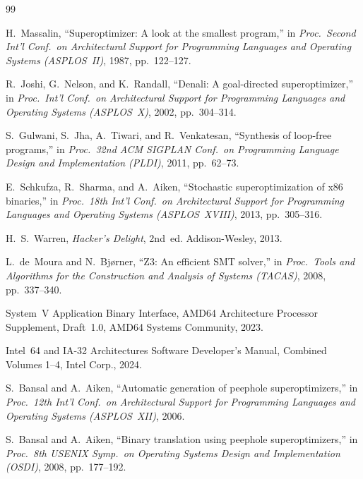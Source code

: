 \documentclass[journal,10pt]{IEEEtran}
\begin{document}
\begin{thebibliography}{99}
\hfuzz=1pt

H.~Massalin, ``Superoptimizer: A look at the smallest program,''
in \emph{Proc.\ Second Int'l Conf.\ on Architectural Support for
Programming Languages and Operating Systems (ASPLOS~II)}, 1987,
pp.~122--127.

R.~Joshi, G.~Nelson, and K.~Randall, ``Denali: A goal-directed
superoptimizer,'' in \emph{Proc.\ Int'l Conf.\ on Architectural
Support for Programming Languages and Operating Systems (ASPLOS~X)},
2002, pp.~304--314.

S.~Gulwani, S.~Jha, A.~Tiwari, and R.~Venkatesan, ``Synthesis of
loop-free programs,'' in \emph{Proc.\ 32nd ACM SIGPLAN Conf.\ on
Programming Language Design and Implementation (PLDI)}, 2011,
pp.~62--73.

E.~Schkufza, R.~Sharma, and A.~Aiken, ``Stochastic superoptimization
of x86 binaries,'' in \emph{Proc.\ 18th Int'l Conf.\ on Architectural
Support for Programming Languages and Operating Systems (ASPLOS~XVIII)},
2013, pp.~305--316.

H.~S.~Warren, \emph{Hacker's Delight}, 2nd~ed. Addison-Wesley, 2013.

L.~de~Moura and N.~Bj{\o}rner, ``Z3: An efficient SMT solver,'' in
\emph{Proc.\ Tools and Algorithms for the Construction and Analysis of
Systems (TACAS)}, 2008, pp.~337--340.

System~V Application Binary Interface, AMD64 Architecture Processor
Supplement, Draft~1.0, AMD64 Systems Community, 2023.

Intel~64 and IA-32 Architectures Software Developer's Manual,
Combined Volumes 1--4, Intel Corp., 2024.

S.~Bansal and A.~Aiken, ``Automatic generation of peephole
superoptimizers,'' in \emph{Proc.\ 12th Int'l Conf.\ on Architectural
Support for Programming Languages and Operating Systems (ASPLOS~XII)},
2006.

S.~Bansal and A.~Aiken, ``Binary translation using peephole
superoptimizers,'' in \emph{Proc.\ 8th USENIX Symp.\ on Operating
Systems Design and Implementation (OSDI)}, 2008, pp.~177--192.


\end{thebibliography}
\end{document}
